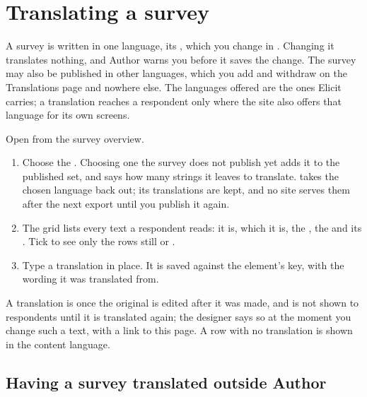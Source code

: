 \documentclass[11pt, a4paper]{article}
\begin{document}
\section{Translating a survey}
\label{sec:translate}

A survey is written in one language, its , which you change in
. Changing it translates nothing, and Author warns you before it saves the
change. The survey may also be published in other languages, which you add and withdraw on the
Translations page and nowhere else. The languages offered are the ones Elicit carries; a
translation reaches a respondent only where the site also offers that language for its own
screens.

Open  from the survey overview.

\begin{enumerate}
  \item Choose the . Choosing one the survey does not publish yet adds it to the
        published set, and says how many strings it leaves to translate.  takes the
        chosen language back out; its translations are kept, and no site serves them after the
        next export until you publish it again.
  \item The grid lists every text a respondent reads:  it is, which  it is,
        the , the  and its . Tick  to see only the rows still  or .
  \item Type a translation in place. It is saved against the element's key, with the wording it
        was translated from.
\end{enumerate}


A translation is  once the original is edited after it was made, and is not shown
to respondents until it is translated again; the designer says so at the moment you change such a
text, with a link to this page. A row with no translation is shown in the content language.

\subsection{Having a survey translated outside Author}
\end{document}
